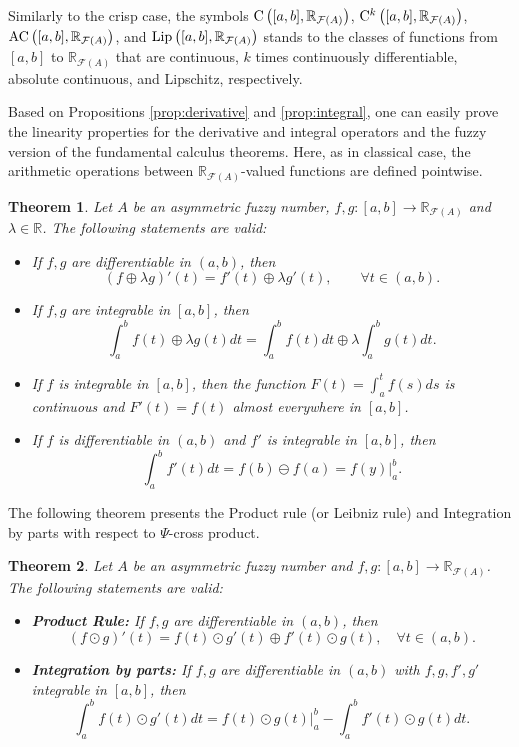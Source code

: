 \documentclass[12pt,a4paper]{article}
\newcommand{\RR}{\mathbb{R}}
\newcommand{\RFA}{\mathbb{R}_{\mathcal{F}(A)}}
\newtheorem{theorem}{Theorem}
\begin{document}
Similarly to the crisp case, the symbols $\textnormal{C}\left([a,b],\RFA\right)$, 
$ \textnormal{C}{}^k\left([a,b],\RFA\right)$, 
$\textnormal{AC}\left([a,b],\RFA\right)$, and
$\textnormal{Lip}\left([a,b],\RFA\right)$
stands to the classes of functions from $[a,b]$ to $\RFA$ that are 
continuous, $k$ times continuously  differentiable, absolute continuous, and Lipschitz, respectively.  

Based on Propositions \ref{prop:derivative} and \ref{prop:integral}, one can easily prove the 
linearity properties for the derivative and integral operators and the fuzzy version of the fundamental calculus theorems. Here, as in classical case, the arithmetic operations between $\RFA$-valued functions are defined pointwise.  

\begin{theorem} \cite{santo2020calculus,shen2022calculus}
Let $A$ be an asymmetric fuzzy number, $f,g:[a,b]\to \RFA$ and $\lambda \in \RR$. 
The following statements are valid:
\begin{itemize}
\item[a)] If $f,g$ are differentiable in $(a,b)$, then 
$$
(f \oplus \lambda g)'(t) = f'(t) \oplus \lambda g'(t), \qquad \forall t \in (a,b).
$$
\item[b)] If $f,g$ are integrable in $[a,b]$, then 
$$
\int_a^b f(t) \oplus \lambda g(t)dt = \int_a^b f(t) dt \oplus \lambda \int_a^b g(t)dt.
$$
\item[c)] If $f$ is integrable in $[a,b]$, then the function $F(t) = \int_a^t f(s)ds$ is continuous 
and $F'(t) = f(t)$ almost everywhere in $[a,b]$. 
\item[d)] If $f$ is differentiable in $(a,b)$ and $f'$ is integrable in $[a,b]$, then 
$$
\int_a^b f'(t) dt = f(b) \ominus f(a) = f(y)\Big|_a^b .
$$
\end{itemize}
\end{theorem}

The following theorem presents the Product rule (or Leibniz rule) and 
Integration by parts with respect to $\Psi$-cross product.  

\begin{theorem}\cite{simoes2023interactive}
Let $A$ be an asymmetric fuzzy number and $f,g:[a,b]\to \RFA$. 
The following statements are valid:
\begin{itemize}
\item {\bf Product Rule:} If $f,g$ are differentiable in $(a,b)$, then 
$$
(f\odot g)'(t) = f(t) \odot g'(t) \oplus f'(t) \odot g(t), \quad \forall t \in (a,b).
$$
\item {\bf Integration by parts:} If $f,g$ are differentiable in $(a,b)$ with $f,g,f',g'$ integrable in $[a,b]$, then 
$$
\int_a^b f(t)\odot g'(t)dt = f(t) \odot g(t) \Big|_a^b - \int_a^b f'(t)\odot g(t)dt.
$$
\end{itemize}
\end{theorem}
\end{document}
